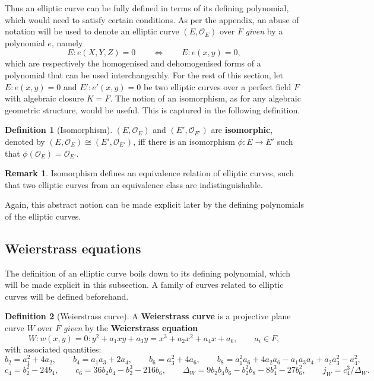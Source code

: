 \documentclass{article}
\newcommand{\rb}[1]{\left( #1 \right)}
\theoremstyle{definition}
\newtheorem*{definition}{Definition}
\newtheorem*{remark}{Remark}
\begin{document}
Thus an elliptic curve can be fully defined in terms of its defining polynomial, which would need to satisfy certain conditions. As per the appendix, an abuse of notation will be used to denote an elliptic curve $ \rb{E, \mathcal{O}_E} $ over $ F $ \emph{given} by a polynomial $ e $, namely
$$ E : e\rb{X, Y, Z} = 0 \qquad \iff \qquad E : e\rb{x, y} = 0, $$
which are respectively the homogenised and dehomogenised forms of a polynomial that can be used interchangeably. For the rest of this section, let $ E : e\rb{x, y} = 0 $ and $ E' : e'\rb{x, y} = 0 $ be two elliptic curves over a perfect field $ F $ with algebraic closure $ K = \overline{F} $. The notion of an isomorphism, as for any algebraic geometric structure, would be useful. This is captured in the following definition.

\begin{definition}[Isomorphism]
$ \rb{E, \mathcal{O}_E} $ and $ \rb{E', \mathcal{O}_{E'}} $ are \textbf{isomorphic}, denoted by $ \rb{E, \mathcal{O}_E} \cong \rb{E', \mathcal{O}_{E'}} $, iff there is an isomorphism $ \phi : E \to E' $ such that $ \phi\rb{\mathcal{O}_E} = \mathcal{O}_{E'} $.
\end{definition}

\begin{remark}
Isomorphism defines an equivalence relation of elliptic curves, such that two elliptic curves from an equivalence class are indistinguishable.
\end{remark}

Again, this abstract notion can be made explicit later by the defining polynomials of the elliptic curves.

\pagebreak

\subsection{Weierstrass equations}

The definition of an elliptic curve boils down to its defining polynomial, which will be made explicit in this subsection. A family of curves related to elliptic curves will be defined beforehand.

\begin{definition}[Weierstrass curve]
A \textbf{Weierstrass curve} is a projective plane curve $ W $ over $ F $ \emph{given} by the \textbf{Weierstrass equation}
$$ W : w\rb{x, y} = 0 : y^2 + a_1xy + a_3y = x^3 + a_2x^2 + a_4x + a_6, \qquad a_i \in F, $$
with associated quantities:
$$ b_2 = a_1^2 + 4a_2, \qquad b_4 = a_1a_3 + 2a_4, \qquad b_6 = a_3^2 + 4a_6, \qquad b_8 = a_1^2a_6 + 4a_2a_6 - a_1a_3a_4 + a_2a_3^2 - a_4^2, $$
$$ c_4 = b_2^2 - 24b_4, \qquad c_6 = 36b_2b_4 - b_2^3 - 216b_6, \qquad \Delta_W = 9b_2b_4b_6 - b_2^2b_8 - 8b_4^3 - 27b_6^2, \qquad j_W = c_4^3 / \Delta_W. $$
\end{definition}
\end{document}
